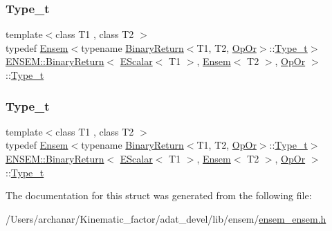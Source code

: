 \subsubsection{\texorpdfstring{Type\_t}{Type\_t}\hspace{0.1cm}{\footnotesize\ttfamily [1/2]}}
{\footnotesize\ttfamily template$<$class T1 , class T2 $>$ \\
typedef \mbox{\hyperlink{classENSEM_1_1Ensem}{Ensem}}$<$typename \mbox{\hyperlink{structENSEM_1_1BinaryReturn}{Binary\+Return}}$<$T1, T2, \mbox{\hyperlink{structENSEM_1_1OpOr}{Op\+Or}}$>$\+::\mbox{\hyperlink{structENSEM_1_1BinaryReturn_3_01EScalar_3_01T1_01_4_00_01Ensem_3_01T2_01_4_00_01OpOr_01_4_a84f29080070490dfc3b1eb1b69150380}{Type\+\_\+t}}$>$ \mbox{\hyperlink{structENSEM_1_1BinaryReturn}{E\+N\+S\+E\+M\+::\+Binary\+Return}}$<$ \mbox{\hyperlink{classENSEM_1_1EScalar}{E\+Scalar}}$<$ T1 $>$, \mbox{\hyperlink{classENSEM_1_1Ensem}{Ensem}}$<$ T2 $>$, \mbox{\hyperlink{structENSEM_1_1OpOr}{Op\+Or}} $>$\+::\mbox{\hyperlink{structENSEM_1_1BinaryReturn_3_01EScalar_3_01T1_01_4_00_01Ensem_3_01T2_01_4_00_01OpOr_01_4_a84f29080070490dfc3b1eb1b69150380}{Type\+\_\+t}}}

\mbox{\label{structENSEM_1_1BinaryReturn_3_01EScalar_3_01T1_01_4_00_01Ensem_3_01T2_01_4_00_01OpOr_01_4_a84f29080070490dfc3b1eb1b69150380}} 
\subsubsection{\texorpdfstring{Type\_t}{Type\_t}\hspace{0.1cm}{\footnotesize\ttfamily [2/2]}}
{\footnotesize\ttfamily template$<$class T1 , class T2 $>$ \\
typedef \mbox{\hyperlink{classENSEM_1_1Ensem}{Ensem}}$<$typename \mbox{\hyperlink{structENSEM_1_1BinaryReturn}{Binary\+Return}}$<$T1, T2, \mbox{\hyperlink{structENSEM_1_1OpOr}{Op\+Or}}$>$\+::\mbox{\hyperlink{structENSEM_1_1BinaryReturn_3_01EScalar_3_01T1_01_4_00_01Ensem_3_01T2_01_4_00_01OpOr_01_4_a84f29080070490dfc3b1eb1b69150380}{Type\+\_\+t}}$>$ \mbox{\hyperlink{structENSEM_1_1BinaryReturn}{E\+N\+S\+E\+M\+::\+Binary\+Return}}$<$ \mbox{\hyperlink{classENSEM_1_1EScalar}{E\+Scalar}}$<$ T1 $>$, \mbox{\hyperlink{classENSEM_1_1Ensem}{Ensem}}$<$ T2 $>$, \mbox{\hyperlink{structENSEM_1_1OpOr}{Op\+Or}} $>$\+::\mbox{\hyperlink{structENSEM_1_1BinaryReturn_3_01EScalar_3_01T1_01_4_00_01Ensem_3_01T2_01_4_00_01OpOr_01_4_a84f29080070490dfc3b1eb1b69150380}{Type\+\_\+t}}}



The documentation for this struct was generated from the following file\+:\begin{DoxyCompactItemize}
\item 
/\+Users/archanar/\+Kinematic\+\_\+factor/adat\+\_\+devel/lib/ensem/\mbox{\hyperlink{lib_2ensem_2ensem__ensem_8h}{ensem\+\_\+ensem.\+h}}\end{DoxyCompactItemize}
